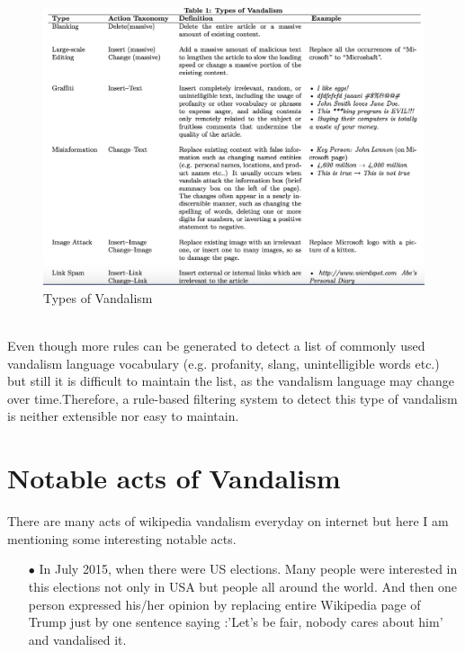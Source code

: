 \documentclass[12pt]{article}
\begin{document}
\begin{figure}[h]
\centering
\includegraphics[scale=0.37]{vandalismtypes.png}
\caption{Types of Vandalism \cite{active}}
\label{vandalismtypes}
\end{figure}\\
Even though more rules can be generated to detect a list of commonly used vandalism language vocabulary (e.g. profanity, slang, unintelligible words etc.) but still it is difficult to maintain the list, as the vandalism language may change over time.Therefore, a rule-based filtering system to detect this type of vandalism is neither extensible nor easy to maintain.
\section{Notable acts of Vandalism}
There are many acts of wikipedia vandalism everyday on internet but here I am mentioning some interesting notable acts.
\begin{itemize}
\item[$\bullet$ ]In July 2015, when there were US elections. Many people were interested in this elections not only in USA but people all around the world. And then one person expressed his/her opinion by replacing entire Wikipedia page of Trump just by one sentence saying :'Let’s be fair, nobody cares about him' and vandalised it\cite{vandalism}.
\end{itemize}
\end{document}
